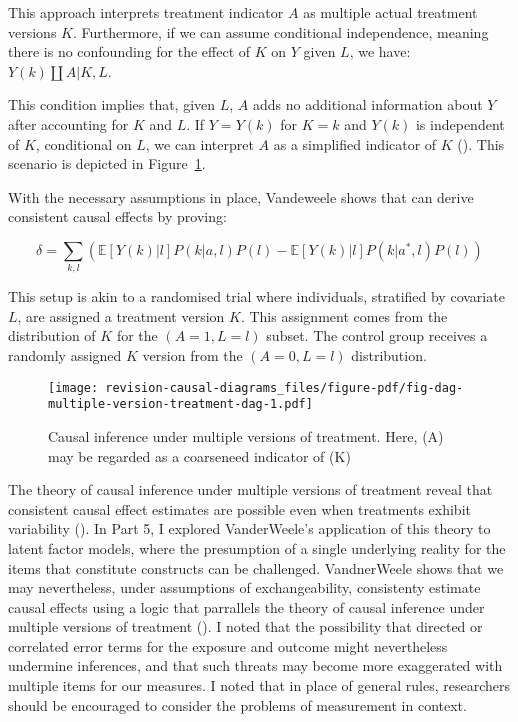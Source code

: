 \documentclass[
  singlecolumn,
  9pt]{article}
\begin{document}
This approach interprets treatment indicator \(A\) as multiple actual
treatment versions \(K\). Furthermore, if we can assume conditional
independence, meaning there is no confounding for the effect of \(K\) on
\(Y\) given \(L\), we have: \(Y(k)\coprod A|K,L\).

This condition implies that, given \(L\), \(A\) adds no additional
information about \(Y\) after accounting for \(K\) and \(L\). If
\(Y = Y(k)\) for \(K = k\) and \(Y(k)\) is independent of \(K\),
conditional on \(L\), we can interpret \(A\) as a simplified indicator
of \(K\) ().
This scenario is depicted in
Figure~\ref{fig-dag-multiple-version-treatment-dag}.

With the necessary assumptions in place, Vandeweele shows that can
derive consistent causal effects by proving:

\[\delta = \sum_{k,l} \left( \mathbb{E}[Y(k)|l] P(k|a,l) P(l) - \mathbb{E}[Y(k)|l] P(k|a^*,l) P(l) \right) \]

This setup is akin to a randomised trial where individuals, stratified
by covariate \(L\), are assigned a treatment version \(K\). This
assignment comes from the distribution of \(K\) for the
\((A = 1, L = l)\) subset. The control group receives a randomly
assigned \(K\) version from the \((A = 0, L = l)\) distribution.

\begin{figure}

{\centering \texttt{[image: revision-causal-diagrams\_files/figure-pdf/fig-dag-multiple-version-treatment-dag-1.pdf]}

}

\caption{\label{fig-dag-multiple-version-treatment-dag}Causal inference
under multiple versions of treatment. Here, (A) may be regarded as a
coarseneed indicator of (K)}

\end{figure}

The theory of causal inference under multiple versions of treatment
reveal that consistent causal effect estimates are possible even when
treatments exhibit variability
(). In Part
5, I explored VanderWeele's application of this theory to latent factor
models, where the presumption of a single underlying reality for the
items that constitute constructs can be challenged. VandnerWeele shows
that we may nevertheless, under assumptions of exchangeability,
consistenty estimate causal effects using a logic that parrallels the
theory of causal inference under multiple versions of treatment
(). I noted that the
possibility that directed or correlated error terms for the exposure and
outcome might nevertheless undermine inferences, and that such threats
may become more exaggerated with multiple items for our measures. I
noted that in place of general rules, researchers should be encouraged
to consider the problems of measurement in context.
\end{document}
